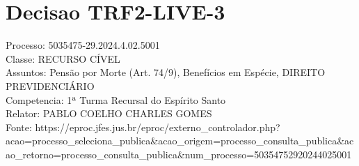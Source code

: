 \documentclass[12pt]{article}
\begin{document}
\section*{Decisao TRF2-LIVE-3}
Processo: 5035475-29.2024.4.02.5001\\
Classe: RECURSO CÍVEL\\
Assuntos: Pensão por Morte (Art. 74/9), Benefícios em Espécie, DIREITO PREVIDENCIÁRIO\\
Competencia: 1ª Turma Recursal do Espírito Santo\\
Relator: PABLO COELHO CHARLES GOMES\\
Fonte: https://eproc.jfes.jus.br/eproc/externo\_controlador.php?acao=processo\_seleciona\_publica\&acao\_origem=processo\_consulta\_publica\&acao\_retorno=processo\_consulta\_publica\&num\_processo=50354752920244025001
\end{document}
